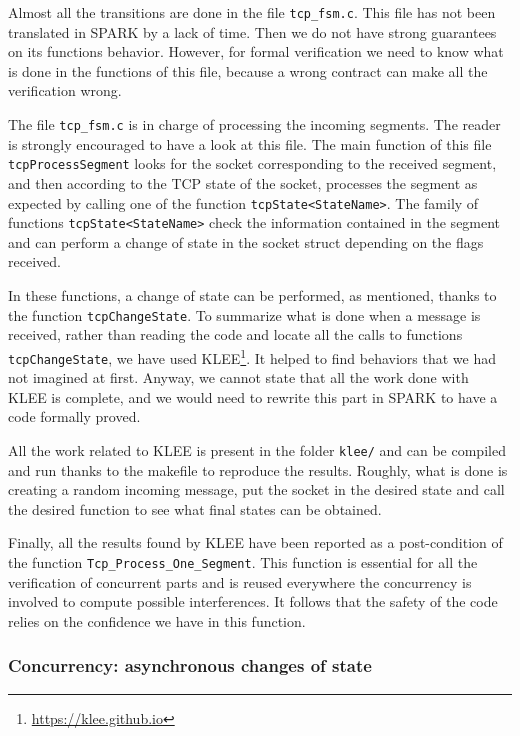 \documentclass[a4paper, 10pt]{article}
\begin{document}
    Almost all the transitions are done in the file \texttt{tcp\_fsm.c}. This file has not been
    translated in SPARK by a lack of time. Then we do not have strong guarantees on its functions
    behavior. However, for formal verification we need to know what is done in the functions of
    this file, because a wrong contract can make all the verification wrong.

    The file \texttt{tcp\_fsm.c} is in charge of processing the incoming segments. The reader is
    strongly encouraged to have a look at this file. The main function of this file
    \texttt{tcpProcessSegment} looks for the socket corresponding to the received segment, and then
    according to the TCP state of the socket, processes the segment as expected by calling one of
    the function \texttt{tcpState<StateName>}. The family of functions \texttt{tcpState<StateName>}
    check the information contained in the segment and can perform a change of state in the socket
    struct depending on the flags received.

    In these functions, a change of state can be performed, as mentioned, thanks to the function
    \texttt{tcpChangeState}. To summarize what is done when a message is received, rather than
    reading the code and locate all the calls to functions \texttt{tcpChangeState}, we have used
    KLEE\footnote{\url{https://klee.github.io}}. It helped to find behaviors that we had not 
    imagined at first. Anyway, we cannot state that all the work done with KLEE is complete, and
    we would need to rewrite this part in SPARK to have a code formally proved.

    All the work related to KLEE is present in the folder \texttt{klee/} and can be compiled and run
    thanks to the makefile to reproduce the results. Roughly, what is done is creating a random
    incoming message, put the socket in the desired state and call the desired function to see what
    final states can be obtained.

    Finally, all the results found by KLEE have been reported as a post-condition of the function \lstinline[language=Ada]{Tcp_Process_One_Segment}.
    This function is essential for all the verification of concurrent parts and is reused everywhere
    the concurrency is involved to compute possible interferences. It follows that the safety of the code
    relies on the confidence we have in this function.

    \subsubsection{Concurrency: asynchronous changes of state}
    \label{section:asynchronous}
\end{document}
